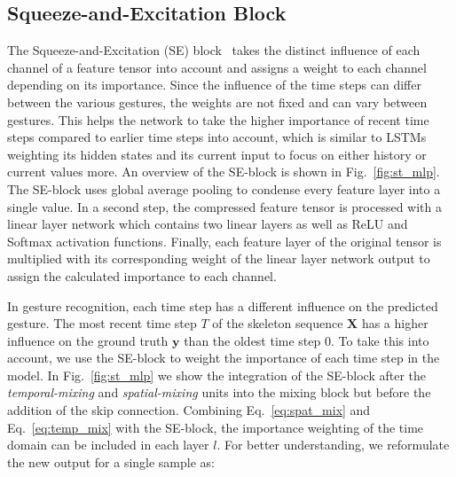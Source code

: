 \documentclass[letterpaper, 10 pt, conference]{ieeeconf}
\begin{document}
\subsection{Squeeze-and-Excitation Block}
\label{subsec:se_model}

The Squeeze-and-Excitation (SE) block~\cite{Hu_2018_CVPR} takes the distinct influence of each channel of a feature tensor into account and assigns a weight to each channel depending on its importance. Since the influence of the time steps can differ between the various gestures, the weights are not fixed and can vary between gestures. This helps the network to take the higher importance of recent time steps compared to earlier time steps into account, which is similar to LSTMs weighting its hidden states and its current input to focus on either history or current values more. An overview of the SE-block is shown in Fig.~\ref{fig:st_mlp}. The SE-block uses global average pooling to condense every feature layer into a single value. In a second step, the compressed feature tensor is processed with a linear layer network which contains two linear layers as well as ReLU and Softmax activation functions. Finally, each feature layer of the original tensor is multiplied with its corresponding weight of the linear layer network output to assign the calculated importance to each channel.

In gesture recognition, each time step has a different influence on the predicted gesture. The most recent time step $T$ of the skeleton sequence $\mathbf{X}$ has a higher influence on the ground truth $\textbf{y}$ than the oldest time step $0$. To take this into account, we use the SE-block to weight the importance of each time step in the model. In Fig.~\ref{fig:st_mlp} we show the integration of the SE-block after the \textit{temporal-mixing} and \textit{spatial-mixing} units into the mixing block but before the addition of the skip connection. Combining Eq.~\ref{eq:spat_mix} and Eq.~\ref{eq:temp_mix} with the SE-block, the importance weighting of the time domain can be included in each layer $l$. For better understanding, we reformulate the new output for a single sample as:
\end{document}
